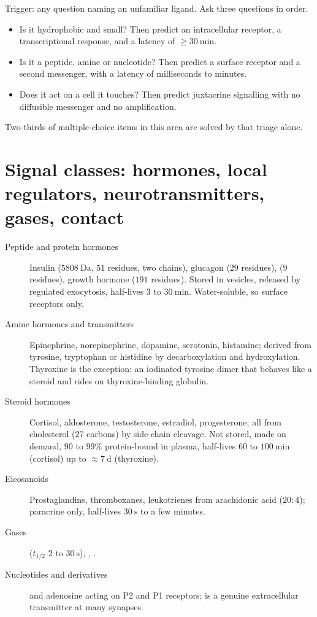 \begin{tipbox}[title={TECHNIQUE: classify the signal before you classify the pathway}]
Trigger: any question naming an unfamiliar ligand. Ask three questions in order.
\begin{itemize}
\item Is it hydrophobic and small? Then predict an intracellular receptor, a
transcriptional response, and a latency of $\geq 30\ \mathrm{min}$.
\item Is it a peptide, amine or nucleotide? Then predict a surface receptor and a
second messenger, with a latency of milliseconds to minutes.
\item Does it act on a cell it touches? Then predict juxtacrine signalling with no
diffusible messenger and no amplification.
\end{itemize}
Two-thirds of multiple-choice items in this area are solved by that triage alone.
\end{tipbox}

\section{Signal classes: hormones, local regulators, neurotransmitters, gases, contact}

\begin{defbox}[title={DEFINITIONS: the chemical families of signals}]
\begin{description}
\item[Peptide and protein hormones] Insulin ($5808\ \mathrm{Da}$, $51$ residues, two
chains), glucagon ($29$ residues),  ($9$ residues), growth hormone
($191$ residues). Stored in vesicles, released by regulated exocytosis, half-lives
$3$ to $30\ \mathrm{min}$. Water-soluble, so surface receptors only.
\item[Amine hormones and transmitters] Epinephrine, norepinephrine, dopamine,
serotonin, histamine; derived from tyrosine, tryptophan or histidine by
decarboxylation and hydroxylation. Thyroxine is the exception: an iodinated tyrosine
dimer that behaves like a steroid and rides on thyroxine-binding globulin.
\item[Steroid hormones] Cortisol, aldosterone, testosterone, estradiol, progesterone;
all from cholesterol ($27$ carbons) by side-chain cleavage. Not stored, made on
demand, $90$ to $99\%$ protein-bound in plasma, half-lives $60$ to $100\ \mathrm{min}$
(cortisol) up to $\approx 7\ \mathrm{d}$ (thyroxine).
\item[Eicosanoids] Prostaglandins, thromboxanes, leukotrienes from arachidonic acid
($20{:}4$); paracrine only, half-lives $30\ \mathrm{s}$ to a few minutes.
\item[Gases]  ($t_{1/2}$ $2$ to $30\ \mathrm{s}$), , .
\item[Nucleotides and derivatives]  and adenosine acting on P2 and P1
receptors;  is a genuine extracellular transmitter at many synapses.
\end{description}
\end{defbox}

